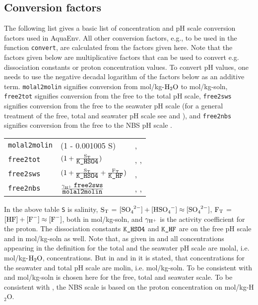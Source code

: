 \documentclass[a4paper]{article}
\begin{document}
\subsection{Conversion factors}
The following list gives a basic list of concentration and pH scale conversion factors used in \textsf{AquaEnv}. All other conversion factors, e.g., to be used in the function \texttt{convert}, are calculated from the factors given here. Note that the factors given below are multiplicative factors that can be used to convert e.g. dissociation constants or proton concentration values. To convert pH values, one needs to use the negative decadal logarithm of the factors below as an additive term. \texttt{molal2molin} signifies conversion from mol/kg-$\rm H_2O$ to mol/kg-soln, \texttt{free2tot} signifies conversion from the free to the total pH scale, \texttt{free2sws}  signifies conversion from the free to the seawater pH scale (for a general treatment of the free, total and seawater pH scale see \citet{Dickson1984} and \citet{Zeebe2001}), and \texttt{free2nbs} signifies conversion from the free to the NBS pH scale \citep{Durst1975}.
\begin{center}
\begin{tabular}{|llp{}|} \hline
\texttt{molal2molin} & (1 - 0.001005 S) & \citet[p. 257]{Roy1993a}, \citet[chap. 5, p. 15]{DOE1994}\\
\texttt{free2tot} & $\rm (1 + \frac{S_T}{\mbox{\texttt{K\_HSO4}}})$ &\citet[p. 2302]{Dickson1984}, \citet[chap. 5, p. 16]{DOE1994}, \citet[p. 57, p. 261]{Zeebe2001}\\
\texttt{free2sws} &  $\rm (1 + \frac{S_T}{\mbox{\texttt{K\_HSO4}}} + \frac{F_T}{\mbox{\texttt{K\_HF}}})$ & \citet[p. 2303]{Dickson1984}, \citet{Zeebe2001}\\
\texttt{free2nbs} &  $\rm \frac{\gamma_{\rm H^+}\;\mbox{\texttt{free2sws}}}{\mbox{\texttt{molal2molin}}}$ & \citet{Dickson1984}, \citet{Lewis1998}, \citet{Zeebe2001}\\ \hline
\end{tabular}
\end{center}
In the above table \texttt{S} is salinity, $\rm S_T$ = $[\ce{SO_4^{2-}}] + [\ce{HSO_4^-}] \approx [\ce{SO_4^{2-}}]$, $\rm F_T$ = $\rm [\ce{HF}] + [\ce{F^-}] \approx [\ce{F^-}]$, both in mol/kg-soln, and $\rm \gamma_{\rm H^+}$ is the activity coefficient for the proton. The dissociation constants $\mbox{\texttt{K\_HSO4}}$ and $\mbox{\texttt{K\_HF}}$ are on the free pH scale and in mol/kg-soln as well. Note that, as given in \citet[p. 2303]{Dickson1984} and \citet[p. 91f]{Dickson1979} all concentrations appearing in the definition for the total and the seawater pH scale are molal, i.e.  mol/kg-$\rm H_2O$, concentrations. But in \citet[p. 257]{Roy1993a} and in \citet[chap.. 4, SOP 6, p. 1]{DOE1994} it is stated, that concentrations for the seawater and total pH scale are molin, i.e. mol/kg-soln. To be consistent with \citet{DOE1994} and \cite{Dickson2007} mol/kg-soln is chosen here for the free, total and seawater scale. To be consistent with \cite{Lewis1998}, the NBS scale is based on the proton concentration on mol/kg-H$_2$O.
\end{document}
